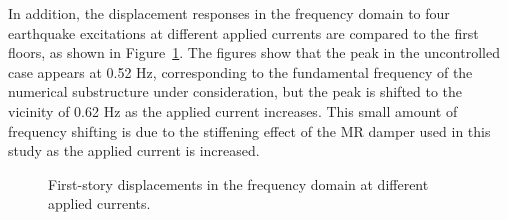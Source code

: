 In addition, the displacement responses in the frequency domain to four earthquake excitations at different applied currents are compared to the first floors, as shown in Figure~\ref{fig:8-18}. The figures show that the peak in the uncontrolled case appears at 0.52 Hz, corresponding to the fundamental frequency of the numerical substructure under consideration, but the peak is shifted to the vicinity of 0.62 Hz as the applied current increases. This small amount of frequency shifting is due to the stiffening effect of the MR damper used in this study as the applied current is increased.

\begin{figure}[H]
\centering
{}
\caption{First-story displacements in the frequency domain at different applied currents.}
\label{fig:8-18}
\end{figure}

